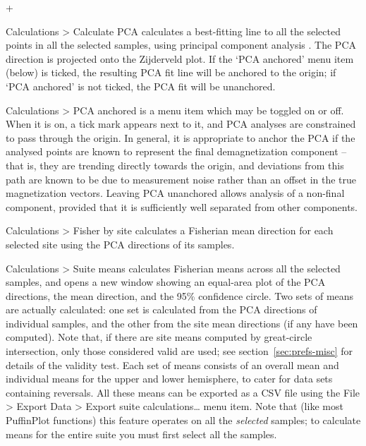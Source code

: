 \documentclass[a4paper,british]{article}
\newcommand{\menuitemlabel}[1]{%
\mbox{\textsf{#1}}\hfil}
\newenvironment{menuitemlist}%
{\begin{list}{}{%
\renewcommand{\makelabel}{\menuitemlabel}%
\setlength{\labelwidth}{35pt}%
\setlength{\leftmargin}%
             {\labelwidth+\labelsep}}}%
{\end{list}}
\newcommand{\ppcmd}[1]{\textsf{#1}} %
\newcommand{\caps}[1]{\MakeTextUppercase{#1}} %
\newcommand{\submenu}{ \textgreater{} } %
\begin{document}
\begin{menuitemlist}

\item[Calculations\submenu Calculate \caps{pca}] calculates a best-fitting
  line to all the selected points in all the selected samples, using
  principal component analysis \citep{kirschvink1980least}. The \caps{pca}
  direction is projected onto the Zijderveld plot. If the `\caps{pca}
  anchored' menu item (below) is ticked, the resulting \caps{pca} fit line
  will be anchored to the origin; if `\caps{pca} anchored' is not ticked, the
  \caps{pca} fit will be unanchored.

\item[Calculations\submenu \caps{pca} anchored] is a menu item which may be
  toggled on or off. When it is on, a tick mark appears next to it, and
  \caps{pca} analyses are constrained to pass through the origin. In general,
  it is appropriate to anchor the \caps{pca} if the analysed points are known
  to represent the final demagnetization component -- that is, they are
  trending directly towards the origin, and deviations from this path are
  known to be due to measurement noise rather than an offset in the true
  magnetization vectors. Leaving \caps{pca} unanchored allows analysis of a
  non-final component, provided that it is sufficiently well separated from
  other components.

\item[Calculations\submenu Fisher by site] calculates a Fisherian mean
  direction for each selected site using the \caps{pca} directions of its
  samples.

\item[Calculations\submenu Suite means] calculates Fisherian means across all
  the selected samples, and opens a new window showing an equal-area plot of
  the \caps{pca} directions, the mean direction, and the 95\% confidence
  circle. Two sets of means are actually calculated: one set is calculated
  from the \caps{pca} directions of individual samples, and the other from
  the site mean directions (if any have been computed). Note that, if there
  are site means computed by great-circle intersection, only those considered
  valid are used; see section~\ref{sec:prefs-misc} for details of the
  validity test. Each set of means consists of an overall mean and individual
  means for the upper and lower hemisphere, to cater for data sets containing
  reversals. All these means can be exported as a \caps{csv} file using the
  \ppcmd{File\submenu Export Data\submenu Export suite calculations\ldots}
  menu item. Note that (like most PuffinPlot functions) this feature operates
  on all the \emph{selected} samples; to calculate means for the entire suite
  you must first select all the samples.


\end{menuitemlist}
\end{document}
